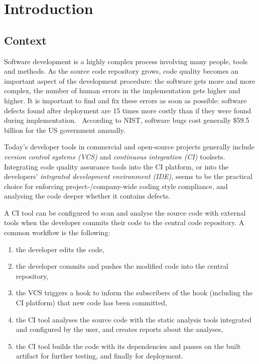 \chapter{Introduction}
\label{chapter:introduction}


\section{Context}

Software development is a highly complex process involving many people, tools and methods. As the source code repository grows, code quality becomes an important aspect of the development procedure: the software gets more and more complex, the number of human errors in the implementation gets higher and higher. It is important to find and fix these errors as soon as possible: software defects found after deployment are 15 times more costly than if they were found during implementation.~\cite{dawson2010integrating} According to NIST, software bugs cost generally \$59.5 billion for the US government annually.~\cite{tassey2002economic}

Today's developer tools in commercial and open-source projects generally include \emph{version control systems (VCS)} and \emph{continuous integration (CI)} toolsets.~\cite{hilton2016usage, fowlerCI} Integrating code quality assurance tools into the CI platform, or into the developers' \emph{integrated development environment (IDE)}, seems to be the practical choice for enforcing project-/company-wide coding style compliance, and analysing the code deeper whether it contains defects.

A CI tool can be configured to scan and analyse the source code with external tools when the developer commits their code to the central code repository. A common workflow is the following:

\begin{enumerate}
\item the developer edits the code,
\item the developer commits and pushes the modified code into the central repository,
\item the VCS triggers a hook to inform the subscribers of the hook (including the CI platform) that new code has been committed,
\item the CI tool analyses the source code with the static analysis tools integrated and configured by the user, and creates reports about the analyses,
\item the CI tool builds the code with its dependencies and passes on the built artifact for further testing, and finally for deployment.
\end{enumerate}

